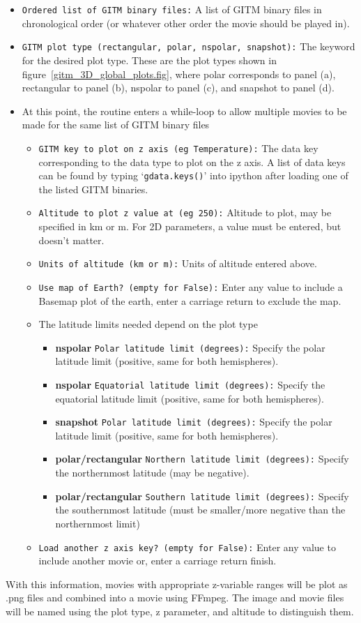 \begin{itemize}
\item{{\tt Ordered list of GITM binary files:}  A list of GITM binary files in chronological order (or whatever other order the movie should be played in).}
\item{{\tt GITM plot type (rectangular, polar, nspolar, snapshot):}  The keyword for the desired plot type.  These are the plot types shown in figure~\ref{gitm_3D_global_plots.fig}, where polar corresponds to panel (a), rectangular to panel (b), nspolar to panel (c), and snapshot to panel (d).}
\item{At this point, the routine enters a while-loop to allow multiple movies to be made for the same list of GITM binary files}
	\begin{itemize}
	\item{{\tt GITM key to plot on z axis (eg Temperature):} The data key corresponding to the data type to plot on the z axis.  A list of data keys can be found by typing `{\tt gdata.keys()}' into ipython after loading one of the listed GITM binaries.}
	\item{{\tt Altitude to plot z value at (eg 250):} Altitude to plot, may be specified in km or m.  For 2D parameters, a value must be entered, but doesn't matter.}
	\item{{\tt Units of altitude (km or m):} Units of altitude entered above.}
	\item{{\tt Use map of Earth? (empty for False):} Enter any value to include a Basemap plot of the earth, enter a carriage return to exclude the map.}
	\item{The latitude limits needed depend on the plot type}
		\begin{itemize}
		\item{{\bf nspolar}  {\tt Polar latitude limit (degrees):} Specify the polar latitude limit (positive, same for both hemispheres).}
		\item{{\bf nspolar} {\tt Equatorial latitude limit (degrees):} Specify the equatorial latitude limit (positive, same for both hemispheres).}
		\item{{\bf snapshot} {\tt Polar latitude limit (degrees):} Specify the polar latitude limit (positive, same for both hemispheres).}
		\item{{\bf polar/rectangular} {\tt Northern latitude limit (degrees):} Specify the northernmost latitude (may be negative).}
     	   	\item{{\bf polar/rectangular} {\tt Southern latitude limit (degrees):} Specify the southernmost latitude (must be smaller/more negative than the northernmost limit)}
		\end{itemize}
		
    \item{{\tt Load another z axis key? (empty for False):} Enter any value to include another movie or, enter a carriage return finish.}
    \end{itemize}
\end{itemize}

With this information, movies with appropriate z-variable ranges will be plot as .png files and combined into a movie using FFmpeg.  The image and movie files will be named using the plot type, z parameter, and altitude to distinguish them.







